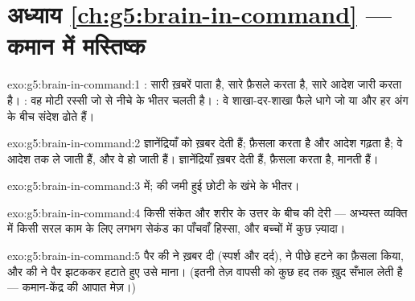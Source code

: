 \section*{अध्याय \ref{ch:g5:brain-in-command} --- कमान में मस्तिष्क}

\begin{solution}{exo:g5:brain-in-command:1}
: सारी ख़बरें पाता है, सारे फ़ैसले करता है, सारे आदेश जारी करता
है। : वह मोटी रस्सी जो  से नीचे  के भीतर चलती है।
: वे शाखा-दर-शाखा फैले धागे जो  या  और हर
अंग के बीच संदेश ढोते हैं।
\end{solution}

\begin{solution}{exo:g5:brain-in-command:2}
ज्ञानेंद्रियाँ  को ख़बर देती हैं;  फ़ैसला करता है और
आदेश गढ़ता है;  वे आदेश  तक ले जाती हैं, और वे 
हो जाती हैं। ज्ञानेंद्रियाँ ख़बर देती हैं,  फ़ैसला करता है,
 मानती हैं।
\end{solution}

\begin{solution}{exo:g5:brain-in-command:3}
  में;   की जमी हुई छोटी  के खंभे के
भीतर।
\end{solution}

\begin{solution}{exo:g5:brain-in-command:4}
किसी संकेत और शरीर के उत्तर के बीच की देरी --- अभ्यस्त व्यक्ति में
किसी सरल काम के लिए लगभग सेकंड का पाँचवाँ हिस्सा, और बच्चों में कुछ
ज़्यादा।
\end{solution}

\begin{solution}{exo:g5:brain-in-command:5}
पैर की  ने ख़बर दी (स्पर्श और दर्द),  ने पीछे हटने
का फ़ैसला किया, और  की  ने पैर झटककर हटाते हुए उसे माना।
(इतनी तेज़ वापसी को कुछ हद तक  ख़ुद सँभाल लेती है ---
कमान-केंद्र की आपात मेज़।)
\end{solution}

